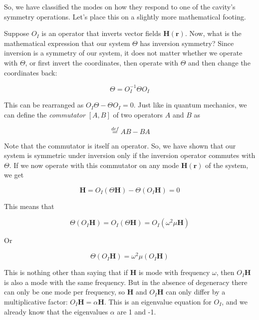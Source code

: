 So, we have classified the modes on how they respond to one of the cavity's symmetry operations. Let's place this on a slightly more mathematical footing. 

Suppose $O_I$ is an operator that inverts vector fields ${\mathbf H({\mathbf r})}$. Now, what is the mathematical expression that our system $\Theta$ has inversion symmetry? Since inversion is a symmetry of our system, it does not matter whether we operate with $\Theta$, or first invert the coordinates, then operate with $\Theta$ and then change the coordinates back:

\begin{equation}
\Theta = O_I^{-1} \Theta O_I
\end{equation} 

This can be rearranged as $O_I \Theta - \Theta O_I = 0$. Just like in quantum mechanics, we can define the \emph{commutator} $[A,B]$ of two operators $A$ and $B$ as

\begin{equation}
[A,B] \stackrel{def}{=} AB - BA
\end{equation} 

Note that the commutator is itself an operator. So, we have shown that our system is symmetric under inversion only if the inversion operator commutes with $\Theta$. If we now operate with this commutator on any mode ${\mathbf H({\mathbf r})}$ of the system, we get

\begin{equation}
[O_I, \Theta] {\mathbf H}= O_I(\Theta {\mathbf H}) - \Theta (O_I {\mathbf H} ) = 0
\end{equation} 

This means that

\begin{equation}
\Theta (O_I {\mathbf H} ) = O_I(\Theta {\mathbf H}) = O_I ( \omega^2 \mu {\mathbf H})
\end{equation} 

Or

\begin{equation}
\Theta (O_I {\mathbf H} ) =  \omega^2 \mu (O_I {\mathbf H})
\end{equation} 

This is nothing other than saying that if ${\mathbf H}$ is mode with frequency $\omega$, then $O_I {\mathbf H}$ is also a mode with the same frequency. But in the absence of degeneracy there can only be one mode per frequency, so ${\mathbf H}$ and $O_I {\mathbf H}$ can only differ by a multiplicative factor: $O_I {\mathbf H} = \alpha {\mathbf H}$. This is an eigenvalue equation for $O_I$, and we already know that the eigenvalues $\alpha$ are 1 and -1. 

